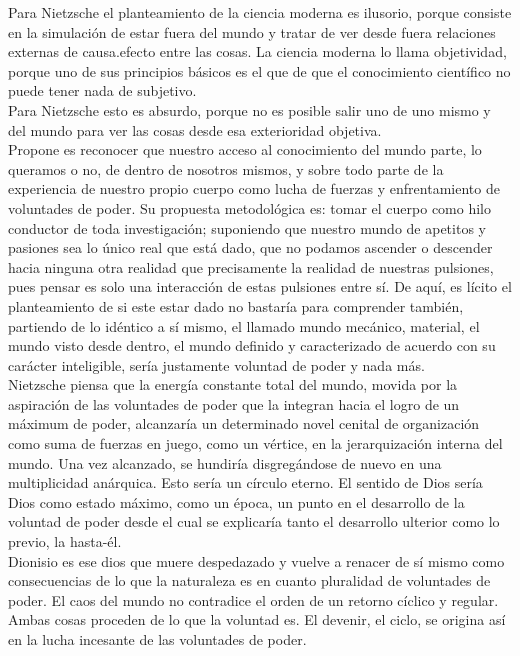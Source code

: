 \documentclass[a4paper, 10pt, twocolumn, spanish]{article}
\begin{document}
Para Nietzsche el planteamiento de la ciencia moderna es ilusorio,
porque consiste en la simulación de estar fuera del mundo y tratar de
ver desde fuera relaciones externas de causa.efecto entre las
cosas. La ciencia moderna lo llama objetividad, porque uno de sus
principios básicos es el que de que el conocimiento científico no
puede tener nada de subjetivo.\\[0pt]
Para Nietzsche esto es absurdo, porque no es posible salir uno de uno
mismo y del mundo para ver las cosas desde esa exterioridad
objetiva.\\[0pt]
Propone es reconocer que nuestro acceso al conocimiento del mundo
parte, lo queramos o no, de dentro de nosotros mismos, y sobre todo
parte de la experiencia de nuestro propio cuerpo como lucha de fuerzas
y enfrentamiento de voluntades de poder. Su propuesta metodológica es:
tomar el cuerpo como hilo conductor de toda investigación; suponiendo
que nuestro mundo de apetitos y pasiones sea lo único real que está
dado, que no podamos ascender o descender hacia ninguna otra realidad
que precisamente la realidad de nuestras pulsiones, pues pensar es
solo una interacción de estas pulsiones entre sí. De aquí, es lícito
el planteamiento de si este estar dado no bastaría para comprender
también, partiendo de lo idéntico a sí mismo, el llamado mundo
mecánico, material, el mundo visto desde dentro, el mundo definido y
caracterizado de acuerdo con su carácter inteligible, sería justamente
voluntad de poder y nada más.\\[0pt]

Nietzsche piensa que la energía constante total del mundo, movida por
la aspiración de las voluntades de poder que la integran hacia el
logro de un máximum de poder, alcanzaría un determinado novel cenital
de organización como suma de fuerzas en juego, como un vértice, en la
jerarquización interna del mundo. Una vez alcanzado, se hundiría
disgregándose de nuevo en una multiplicidad anárquica. Esto sería un
círculo eterno. El sentido de Dios sería Dios como estado máximo, como
un época, un punto en el desarrollo de la voluntad de poder desde el
cual se explicaría tanto el desarrollo ulterior como lo previo, la
hasta-él.\\[0pt]
Dionisio es ese dios que muere despedazado y vuelve a renacer de sí
mismo como consecuencias de lo que la naturaleza es en cuanto
pluralidad de voluntades de poder. El caos del mundo no contradice el
orden de un retorno cíclico y regular. Ambas cosas proceden de lo que
la voluntad es. El devenir, el ciclo, se origina así en la lucha
incesante de las voluntades de poder.\\[0pt]
\end{document}
